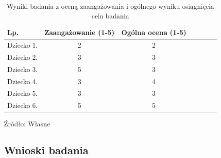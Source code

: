 \documentclass{article}
\begin{document}
\begin{table}[]
	\centering
	\begin{tabular}{|c|c|c|c|c|c|c|}
		\hline
		\multicolumn{1}{|l|}{Lp.} &  \multicolumn{1}{l|}{Zaangażowanie (1-5)} & \multicolumn{1}{l|}{Ogólna ocena (1-5)}  \\ \hline
		Dziecko 1.                    & 2                 & 2                                  \\ \hline
		Dziecko 2.                             & 3                 & 3                                \\ \hline
		Dziecko 3.                             & 5                 & 3                                  \\ \hline
		Dziecko 4.                        & 3               & 4                             \\ \hline
		Dziecko 5.                            & 3               & 3                                 \\ \hline
		Dziecko 6.                              & 5                 & 5                                  \\ \hline
	\end{tabular}
	\caption{Wyniki badania z oceną zaangażowania i ogólnego wyniku osiągnięcia celu badania}
	Źródło: Własne
\end{table}

		
\subsection{Wnioski badania}
\end{document}
